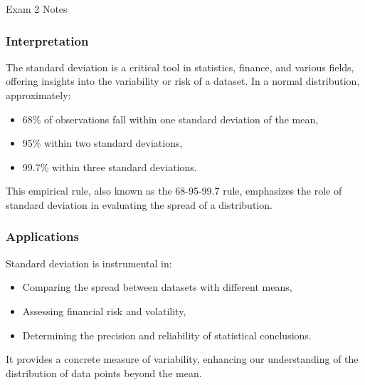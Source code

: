 \begin{examnotes}{Exam 2 Notes}
    \subsubsection*{Interpretation}
    
    The standard deviation is a critical tool in statistics, finance, and various fields, offering insights into the variability or risk of a dataset. In a normal distribution, approximately:
    \begin{itemize}
        \item 68\% of observations fall within one standard deviation of the mean,
        \item 95\% within two standard deviations,
        \item 99.7\% within three standard deviations.
    \end{itemize}
    
    This empirical rule, also known as the 68-95-99.7 rule, emphasizes the role of standard deviation in evaluating the spread of a distribution.
    
    \subsubsection*{Applications}
    
    Standard deviation is instrumental in:
    \begin{itemize}
        \item Comparing the spread between datasets with different means,
        \item Assessing financial risk and volatility,
        \item Determining the precision and reliability of statistical conclusions.
    \end{itemize}
    
    It provides a concrete measure of variability, enhancing our understanding of the distribution of data points beyond the mean.    
\end{examnotes}